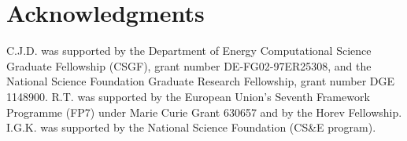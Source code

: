 \documentclass[3p]{elsarticle}
\begin{document}
\section*{Acknowledgments}
C.J.D. was supported by the Department of Energy Computational Science Graduate Fellowship (CSGF), grant number DE-FG02-97ER25308, and the National Science Foundation Graduate Research Fellowship, grant number DGE 1148900. 
%
R.T. was supported by the European Union’s Seventh Framework Programme (FP7) under Marie Curie Grant 630657 and by the Horev Fellowship.
%
I.G.K. was supported by the National Science Foundation (CS\&E program).



%
\end{document}
